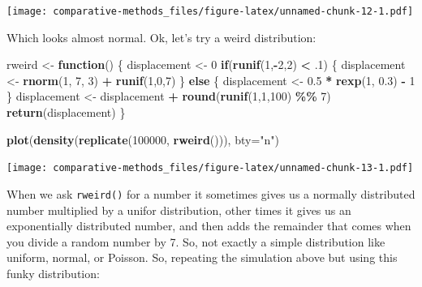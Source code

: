 \documentclass[
]{article}
\newenvironment{Shaded}{\begin{snugshade}}{\end{snugshade}}
\newcommand{\ControlFlowTok}[1]{\textcolor[rgb]{0.13,0.29,0.53}{\textbf{#1}}}
\newcommand{\DataTypeTok}[1]{\textcolor[rgb]{0.13,0.29,0.53}{#1}}
\newcommand{\DecValTok}[1]{\textcolor[rgb]{0.00,0.00,0.81}{#1}}
\newcommand{\FloatTok}[1]{\textcolor[rgb]{0.00,0.00,0.81}{#1}}
\newcommand{\KeywordTok}[1]{\textcolor[rgb]{0.13,0.29,0.53}{\textbf{#1}}}
\newcommand{\NormalTok}[1]{#1}
\newcommand{\OperatorTok}[1]{\textcolor[rgb]{0.81,0.36,0.00}{\textbf{#1}}}
\newcommand{\StringTok}[1]{\textcolor[rgb]{0.31,0.60,0.02}{#1}}
\begin{document}
\texttt{[image: comparative-methods\_files/figure-latex/unnamed-chunk-12-1.pdf]}

Which looks almost normal. Ok, let's try a weird distribution:

\begin{Shaded}
\begin{Highlighting}[]
\NormalTok{rweird <{-}}\StringTok{ }\ControlFlowTok{function}\NormalTok{() \{}
\NormalTok{  displacement <{-}}\StringTok{ }\DecValTok{0}
  \ControlFlowTok{if}\NormalTok{(}\KeywordTok{runif}\NormalTok{(}\DecValTok{1}\NormalTok{,}\OperatorTok{{-}}\DecValTok{2}\NormalTok{,}\DecValTok{2}\NormalTok{) }\OperatorTok{<}\StringTok{ }\FloatTok{.1}\NormalTok{) \{}
\NormalTok{    displacement <{-}}\StringTok{ }\KeywordTok{rnorm}\NormalTok{(}\DecValTok{1}\NormalTok{, }\DecValTok{7}\NormalTok{, }\DecValTok{3}\NormalTok{) }\OperatorTok{+}\StringTok{ }\KeywordTok{runif}\NormalTok{(}\DecValTok{1}\NormalTok{,}\DecValTok{0}\NormalTok{,}\DecValTok{7}\NormalTok{)}
\NormalTok{  \} }\ControlFlowTok{else}\NormalTok{ \{}
\NormalTok{    displacement <{-}}\StringTok{ }\FloatTok{0.5} \OperatorTok{*}\StringTok{ }\KeywordTok{rexp}\NormalTok{(}\DecValTok{1}\NormalTok{, }\FloatTok{0.3}\NormalTok{) }\OperatorTok{{-}}\StringTok{ }\DecValTok{1}
\NormalTok{  \}}
\NormalTok{  displacement <{-}}\StringTok{ }\NormalTok{displacement }\OperatorTok{+}\StringTok{ }\KeywordTok{round}\NormalTok{(}\KeywordTok{runif}\NormalTok{(}\DecValTok{1}\NormalTok{,}\DecValTok{1}\NormalTok{,}\DecValTok{100}\NormalTok{) }\OperatorTok{\%\%}\StringTok{ }\DecValTok{7}\NormalTok{)}
  \KeywordTok{return}\NormalTok{(displacement)  }
\NormalTok{\}}

\KeywordTok{plot}\NormalTok{(}\KeywordTok{density}\NormalTok{(}\KeywordTok{replicate}\NormalTok{(}\DecValTok{100000}\NormalTok{, }\KeywordTok{rweird}\NormalTok{())), }\DataTypeTok{bty=}\StringTok{"n"}\NormalTok{)}
\end{Highlighting}
\end{Shaded}

\texttt{[image: comparative-methods\_files/figure-latex/unnamed-chunk-13-1.pdf]}

When we ask \texttt{rweird()} for a number it sometimes gives us a normally distributed number multiplied by a unifor distribution, other times it gives us an exponentially distributed number, and then adds the remainder that comes when you divide a random number by 7. So, not exactly a simple distribution like uniform, normal, or Poisson. So, repeating the simulation above but using this funky distribution:
\end{document}
